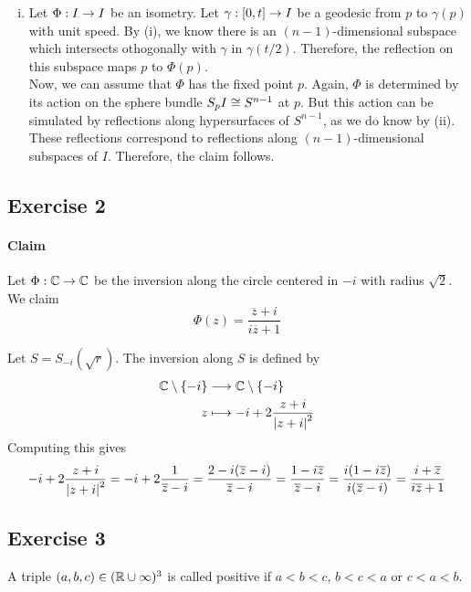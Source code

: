 \documentclass{book}
\renewcommand{\l}[1]{\overline{#1}}
\begin{document}
\begin{Beweis}{}
\begin{enumerate}[(i)]
		\item Let $\Phi : I \overset{}{\rightarrow} I$ be an isometry. Let $\gamma  : [0,t] \overset{}{\rightarrow} I$ be a geodesic from $p$ to $\gamma(p)$ with unit speed. By (i), we know there is an $(n-1)$-dimensional subspace which intersects othogonally with $\gamma$ in $\gamma(t/2)$. Therefore, the reflection on this subspace maps $p$ to $\Phi(p)$.\\
		Now, we can assume that $\Phi$ has the fixed point $p$. Again, $\Phi$ is determined by its action on the sphere bundle $S_pI \overset{}{\cong} S^{n-1}$ at $p$. But this action can be simulated by reflections along hypersurfaces of $S^{n-1}$, as we do know by (ii). These reflections correspond to reflections along $(n-1)$-dimensional subspaces of $I$. Therefore, the claim follows.
	\end{enumerate}
\end{Beweis}

\subsection{Exercise 2}
\paragraph{Claim}
Let $\Phi : \mathbb{C} \overset{}{\rightarrow} \mathbb{C}$ be the inversion along the circle centered in $-i$ with radius $\sqrt{2}$. We claim
\[ \Phi(z) = \frac{\l{z} + i}{i \l{z} + 1} \]
\begin{Beweis}{}
	Let $S = S_{-i}(\sqrt{r})$. The inversion along $S$ is defined by
	\begin{align*}
	\mathbb{C} \setminus \{-i\} & \overset{}{\longrightarrow} \mathbb{C} \setminus \{-i\}\\
	z & \longmapsto -i + 2\frac{z + i}{\left|z + i\right|^2}
	\end{align*}
	Computing this gives
	\[ -i + 2\frac{z + i}{\bet{z + i}^2} = -i + 2\frac{1}{\l{z} - i} =  \frac{2 - i(\l{z}-i)}{\l{z} - i} = \frac{1 - i\l{z}}{\l{z} - i} = \frac{i(1 - i\l{z})}{i(\l{z} - i)} = \frac{i + \l{z}}{i\l{z} +1} \]
\end{Beweis}


\subsection{Exercise 3}
A triple $(a,b,c) \in (\mathbb{R}\cup \infty)^3$ is called positive if $a < b < c$, $ b < c < a $ or $c < a < b$.
\end{document}
